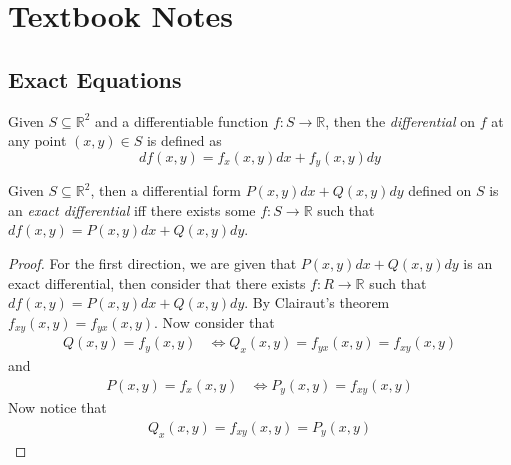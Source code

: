 \documentclass[notes.tex]{subfiles}
\begin{document}
\setcounter{section}{3}
\section{Textbook Notes}
\subsection{Exact Equations}

\begin{definition}
    Given $S \subseteq \mathbb{R}^2$ and a differentiable function $f\colon S \to \mathbb{R}$, then the \textit{differential} on $f$ at any point $(x, y) \in S$ is defined as
    \[
        df(x, y) = f_x(x, y)dx + f_y(x, y)dy
    \]
\end{definition}

\begin{definition}
    Given $S \subseteq \mathbb{R}^2$, then a differential form $P(x, y)dx + Q(x, y)dy$ defined on $S$ is an \textit{exact differential} iff there exists some $f\colon S \to \mathbb{R}$ such that $df(x, y) = P(x, y)dx + Q(x, y)dy$.
\end{definition}

\begin{proof}
    For the first direction, we are given that $P(x, y)dx + Q(x, y)dy$ is an exact differential, then consider that there exists $f\colon R \to \mathbb{R}$ such that $df(x, y) = P(x, y)dx + Q(x, y)dy$. By Clairaut's theorem $f_{xy}(x, y) = f_{yx}(x, y)$. Now consider that
    \begin{align*}
        Q(x, y) = f_y(x, y)
        &\iff Q_x(x, y) = f_{yx}(x, y) = f_{xy}(x, y)
    \end{align*}
    and
    \begin{align*}
        P(x, y) = f_x(x, y)
        &\iff P_y(x, y) = f_{xy}(x, y)
    \end{align*}
    Now notice that
    \begin{align*}
        Q_x(x, y) = f_{xy}(x, y) = P_y(x, y)
    \end{align*}
\end{proof}
\end{document}
